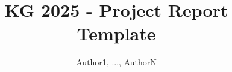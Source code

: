 \documentclass{knowdive}
\title{KG 2025 - Project Report Template}
\author{Author1, ..., AuthorN}
\begin{document}
\maketitle
\begin{sloppypar}
\large
\begin{spacing}{1.05}











\end{spacing}
\end{sloppypar}
\end{document}
